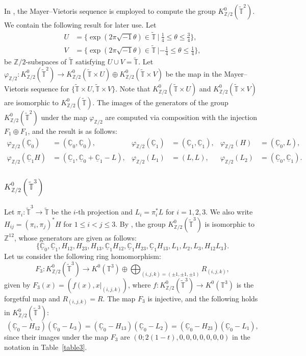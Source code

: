 \documentclass{amsart}
\theoremstyle{plain}
\theoremstyle{definition}
\theoremstyle{remark}
\newcommand{\Z}{\mathbb{Z}}
\newcommand{\C}{\mathbb{C}}
\newcommand{\T}{\mathbb{T}}
\newcommand{\tT}{\widetilde{\T}}
\newcommand{\uC}{\underline{\C}}
\begin{document}
In \cite[Lemma~4.4]{Gomi15}, the Mayer--Vietoris sequence is employed to compute the group $K^0_{\Z/2}(\tT^2)$.
We contain the following result for later use.
Let
\begin{equation}
\label{UV}
\begin{aligned}
	U &= \bigl\{ \exp (2\pi \sqrt{-1} \theta) \in \tT \ | \ \tfrac{1}{4} \leq \theta \leq \tfrac{3}{4} \bigl\},\\
	V &= \bigl\{ \exp (2\pi \sqrt{-1} \theta) \in \tT \ | -\tfrac{1}{4} \leq \theta \leq \tfrac{1}{4} \bigl\},
\end{aligned}
\end{equation}
be $\Z/2$-subspaces of $\tT$ satisfying $U \cup V = \tT$.
Let $\varphi_{\Z/2} \colon K^0_{\Z/2}(\tT^2) \to K^0_{\Z/2}(\tT \times U) \oplus K^0_{\Z/2}(\tT \times V)$ be the map in the Mayer--Vietoris sequence for $\{ \tT \times U,  \tT \times V \}$.
Note that $K^0_{\Z/2}(\tT \times U)$ and $K^0_{\Z/2}(\tT \times V)$ are isomorphic to $K^0_{\Z/2}(\tT)$.
The images of the generators of the group $K^0_{\Z/2}(\tT^2)$ under the map $\varphi_{\Z/2}$ are computed via composition with the injection $F_1 \oplus F_1$, and the result is as follows:
\begin{align*}
	\varphi_{\Z/2}(\uC_0) &= (\uC_0, \uC_0),&
	\varphi_{\Z/2}(\uC_1) &= (\uC_1, \uC_1),&
	\varphi_{\Z/2}(H) &= (\uC_0, L), \\
	\varphi_{\Z/2}(\uC_1 H) &= (\uC_1, \uC_0 + \uC_1 - L),&
	\varphi_{\Z/2}(L_1) &= (L, L),&
	\varphi_{\Z/2}(L_2) &= (\uC_0, \uC_1).
\end{align*}

\subsubsection{$K^0_{\Z/2}(\tT^3)$}
\label{Sect3.3.4}
Let $\pi_i \colon \tT^3 \to \tT$ be the $i$-th projection and $L_i = \pi_i^*L$ for $i=1,2,3$.
We also write $H_{ij} = (\pi_i, \pi_j)^*H$ for $1 \leq i < j \leq 3$.
By \cite[Lemma~4.5]{Gomi15}, the group $K^0_{\Z/2}(\tT^3)$ is isomorphic to $\Z^{12}$, whose generators are given as follows:
\begin{equation*}
\{ \uC_0, \uC_1, H_{12}, H_{23}, H_{13}, \uC_1H_{12}, \uC_1H_{23}, \uC_1H_{13}, L_1, L_2, L_3, H_{12}L_3 \}.
\end{equation*}
Let us consider the following ring homomorphism:
\begin{equation*}
F_3 : K^0_{\Z/2}(\tT^3) \longrightarrow K^0(\T^3) \oplus  \bigoplus_{(i, j, k) = (\pm 1, \pm 1, \pm 1)} R_{(i, j, k)},
\end{equation*}
given by $F_3(x) = (f(x), x|_{(i,j,k)})$, where $f \colon K^0_{\Z/2}(\tT^3) \to K^0(\T^3)$ is the forgetful map and $R_{(i, j, k)} = R$.
The map $F_3$ is injective, and the following holds in $K^0_{\Z/2}(\tT^3)$:
\begin{equation}
\label{eq3}
	(\uC_0 - H_{12})(\uC_0 - L_3) = (\uC_0 - H_{13})(\uC_0 - L_2) = (\uC_0 - H_{23})(\uC_0 - L_1),
\end{equation}
since their images under the map $F_3$ are $(0 ; 2(1-t), 0,0,0,0,0,0,0)$ in the notation in Table~\ref{table3}.
\end{document}
